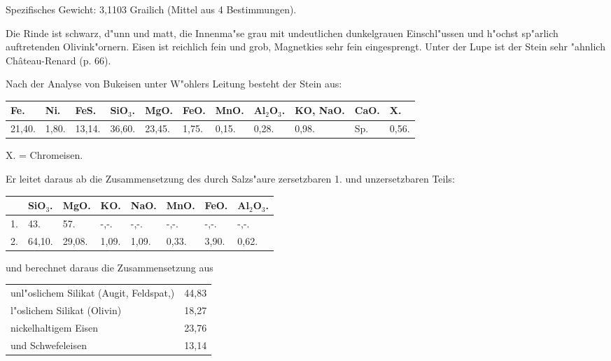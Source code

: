 \documentclass[a4paper, 11pt, oneside]{article}
\begin{document}
Spezifisches Gewicht: 3,1103 Grailich (Mittel aus 4 Bestimmungen).

Die Rinde ist schwarz, d"unn und matt, die Innenma"se grau mit undeutlichen dunkelgrauen Einschl"ussen und h"ochst sp"arlich auftretenden Olivink"ornern. Eisen ist reichlich fein und grob, Magnetkies sehr fein eingesprengt. Unter der Lupe ist der Stein sehr "ahnlich Château-Renard (p. 66).

Nach der Analyse von Bukeisen unter W"ohlers Leitung besteht der Stein aus:

\begin{table}[H]
    \centering
    \footnotesize
    \begin{tabular}{l p{4mm} l l l p{5mm} p{5mm} l l p{4mm} p{4mm}}
        Fe. & Ni. & FeS. & SiO$_{3}$. & MgO. & FeO. & MnO. & Al$_{2}$O$_{3}$. & KO, NaO. & CaO. & X. \\ \hline
        21,40. & 1,80. & 13,14. & 36,60. & 23,45. & 1,75. & 0,15. & 0,28. & 0,98. & Sp. & 0,56. \\
    \end{tabular}
\end{table}

X. = Chromeisen.

Er leitet daraus ab die Zusammensetzung des durch Salzs"aure zersetzbaren 1. und unzersetzbaren Teils:
\begin{table}[H]
    \centering
    \begin{tabular}{l l l l l l l l}
         & SiO$_{3}$. & MgO. & KO. & NaO. & MnO. & FeO. & Al$_{2}$O$_{3}$. \\ \hline
        1. & 43. & 57. & -,-. & -,-. & -,-. & -,-. & -,-. \\
        2. & 64,10. & 29,08. & 1,09. & 1,09. & 0,33. & 3,90. & 0,62. \\
    \end{tabular}
\end{table}

und berechnet daraus die Zusammensetzung aus
\begin{table}[H]
    \centering
    \begin{tabular}{l r}
    \hline
        unl"oslichem Silikat (Augit, Feldspat,) & 44,83 \\
        l"oslichem Silikat (Olivin) & 18,27 \\
        nickelhaltigem Eisen & 23,76 \\
        und Schwefeleisen & 13,14 \\
    \end{tabular}
\end{table}
\end{document}
